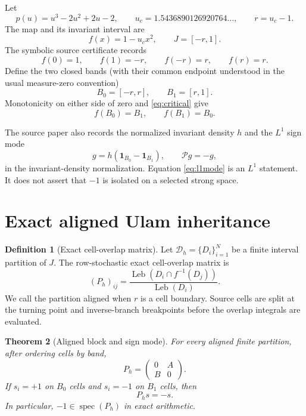 \documentclass[11pt]{article}
\newtheorem{theorem}{Theorem}[section]
\theoremstyle{definition}
\newtheorem{definition}[theorem]{Definition}
\theoremstyle{remark}
\newcommand{\J}{J}
\newcommand{\Bzero}{B_0}
\newcommand{\Bone}{B_1}
\newcommand{\Leb}{\operatorname{Leb}}
\newcommand{\spec}{\operatorname{spec}}
\begin{document}
Let
\begin{equation}
 p(u)=u^3-2u^2+2u-2,
 \qquad u_c=1.5436890126920764\ldots,
 \qquad r=u_c-1.
\end{equation}
The map and its invariant interval are
\begin{equation}
 f(x)=1-u_cx^2,
 \qquad \J=[-r,1].
\end{equation}
The symbolic source certificate records
\begin{equation}
 f(0)=1,\qquad f(1)=-r,\qquad f(-r)=r,\qquad f(r)=r.
 \label{eq:critical}
\end{equation}
Define the two closed bands (with their common endpoint understood in the
usual measure-zero convention)
\begin{equation}
 \Bzero=[-r,r],\qquad \Bone=[r,1].
\end{equation}
Monotonicity on either side of zero and \eqref{eq:critical} give
\begin{equation}
 f(\Bzero)=\Bone,\qquad f(\Bone)=\Bzero.
 \label{eq:exchange}
\end{equation}

The source paper also records the normalized invariant density $h$ and the
$L^1$ sign mode
\begin{equation}
 g=h(\mathbf 1_{\Bzero}-\mathbf 1_{\Bone}),
 \qquad \mathcal P g=-g,
 \label{eq:l1mode}
\end{equation}
in the invariant-density normalization.  Equation \eqref{eq:l1mode} is an
$L^1$ statement.  It does not assert that $-1$ is isolated on a selected
strong space.

\section{Exact aligned Ulam inheritance}

\begin{definition}[Exact cell-overlap matrix]
Let $\mathcal D_h=\{D_i\}_{i=1}^N$ be a finite interval partition of $\J$.
The row-stochastic exact cell-overlap matrix is
\begin{equation}
 (P_h)_{ij}=\frac{\Leb(D_i\cap f^{-1}(D_j))}{\Leb(D_i)}.
 \label{eq:ulam}
\end{equation}
We call the partition aligned when $r$ is a cell boundary.  Source cells are
split at the turning point and inverse-branch breakpoints before the overlap
integrals are evaluated.
\end{definition}

\begin{theorem}[Aligned block and sign mode]\label{thm:block}
For every aligned finite partition, after ordering cells by band,
\begin{equation}
 P_h=\begin{pmatrix}0&A\\B&0\end{pmatrix}.
 \label{eq:block}
\end{equation}
If $s_i=+1$ on $\Bzero$ cells and $s_i=-1$ on $\Bone$ cells, then
\begin{equation}
 P_hs=-s.
 \label{eq:sign}
\end{equation}
In particular, $-1\in\spec(P_h)$ in exact arithmetic.
\end{theorem}
\end{document}
